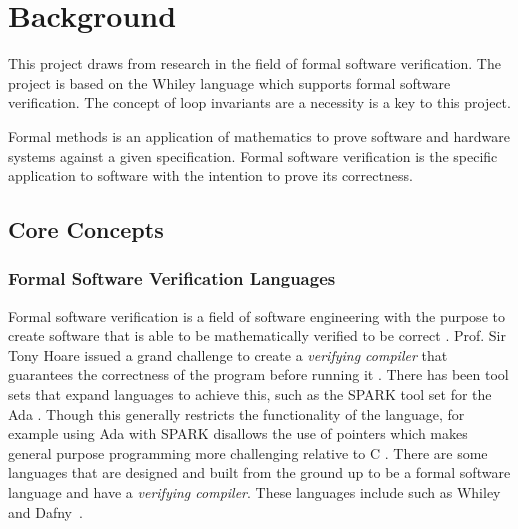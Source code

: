 \chapter{Background}\label{C:background}


This project draws from research in the field of formal software verification.
The project is based on the Whiley language which supports formal software
verification.
The concept of loop invariants are a necessity is a key to this project.

Formal methods is an application of mathematics to prove software and hardware
systems against a given specification. 
Formal software verification is the specific application to software with
the intention to prove its correctness.


\section{Core Concepts}

\subsection{Formal Software Verification Languages}

Formal software verification is a field of software engineering with the
purpose to create software that is able to be mathematically verified to be
correct \cite{survey-formal-soft}.
Prof. Sir Tony Hoare issued a grand challenge to create a \textit{verifying compiler}
that guarantees the correctness of the program before running it \cite{Hoare-grand}.
There has been tool sets that expand languages to achieve this, such as
the SPARK tool set for the Ada \cite{spark-ada}\cite{spark-high-integ}.
Though this generally restricts the functionality of the language, for example
using Ada with SPARK disallows the use of pointers which makes general purpose
programming more challenging relative to C \cite{spark-ada}.
There are some languages that are designed and built from the ground up to
be a formal software language and have a \textit{verifying compiler}.
These languages include such as Whiley~\cite{whiley-origin} and Dafny~\cite{dafny-lang}.


